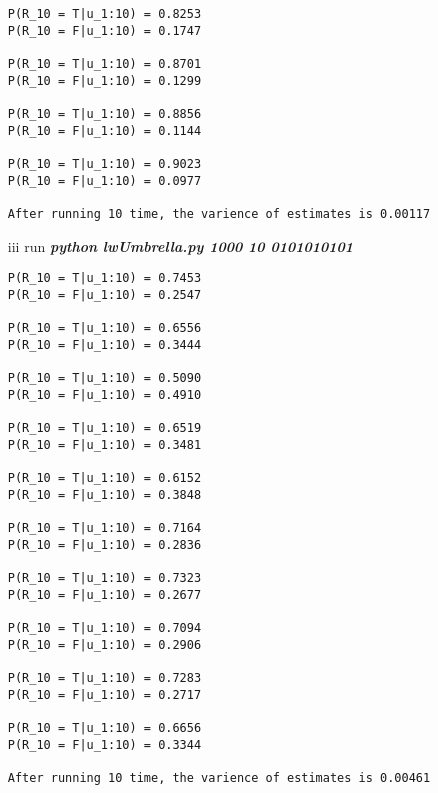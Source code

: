 \documentclass[12pt]{amsart}
\begin{document}
\begin{itemize}
\begin{verbatim}
P(R_10 = T|u_1:10) = 0.8253
P(R_10 = F|u_1:10) = 0.1747

P(R_10 = T|u_1:10) = 0.8701
P(R_10 = F|u_1:10) = 0.1299

P(R_10 = T|u_1:10) = 0.8856
P(R_10 = F|u_1:10) = 0.1144

P(R_10 = T|u_1:10) = 0.9023
P(R_10 = F|u_1:10) = 0.0977

After running 10 time, the varience of estimates is 0.00117
\end{verbatim}
\item[iii] run \textit{\textbf{python lwUmbrella.py 1000 10 0101010101}}
\begin{verbatim}
P(R_10 = T|u_1:10) = 0.7453
P(R_10 = F|u_1:10) = 0.2547

P(R_10 = T|u_1:10) = 0.6556
P(R_10 = F|u_1:10) = 0.3444

P(R_10 = T|u_1:10) = 0.5090
P(R_10 = F|u_1:10) = 0.4910

P(R_10 = T|u_1:10) = 0.6519
P(R_10 = F|u_1:10) = 0.3481

P(R_10 = T|u_1:10) = 0.6152
P(R_10 = F|u_1:10) = 0.3848

P(R_10 = T|u_1:10) = 0.7164
P(R_10 = F|u_1:10) = 0.2836

P(R_10 = T|u_1:10) = 0.7323
P(R_10 = F|u_1:10) = 0.2677

P(R_10 = T|u_1:10) = 0.7094
P(R_10 = F|u_1:10) = 0.2906

P(R_10 = T|u_1:10) = 0.7283
P(R_10 = F|u_1:10) = 0.2717

P(R_10 = T|u_1:10) = 0.6656
P(R_10 = F|u_1:10) = 0.3344

After running 10 time, the varience of estimates is 0.00461
\end{verbatim}
\end{itemize}
\end{document}
